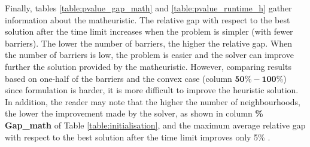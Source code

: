 \documentclass[a4paper,  review, authoryear, 1p.]{elsarticle}
\newcommand{\KMPN}{{\sf{H-KMPN}\xspace }}
\newcommand{\JP}[1]{{\color{blue}#1}}
\begin{document}
		
			
		
		\JP{
		Finally, tables \ref{table:pvalue_gap_math} and \ref{table:pvalue_runtime_h} gather information about the matheuristic.  The relative gap with respect to the best solution after the time limit increases when the problem is simpler (with fewer barriers). The lower the number of barriers, the higher the relative gap. When the number of barriers is low, the problem is easier and the solver can improve further the solution provided by the matheuristic. 	However, comparing results based on one-half of the barriers and the convex case (column $\bm{50\%-100\%}$) since \KMPN \xspace formulation is harder, it is more difficult to improve the heuristic solution. In addition, the reader may note that the higher the number of neighbourhoods, the lower the improvement made by the solver, as shown in column \textbf{\% Gap\_math} of Table \ref{table:initialisation}, and the maximum average relative gap with respect to the best solution after the time limit improves only 5\% . 

}
\end{document}
